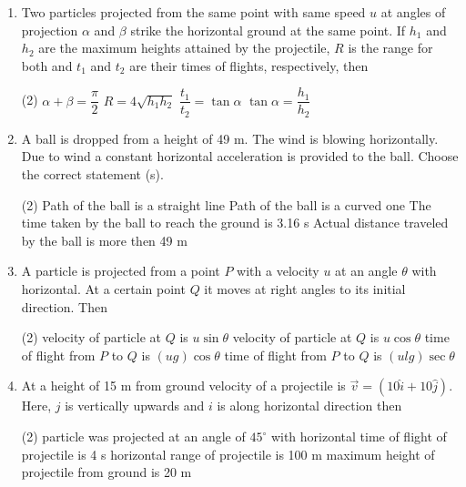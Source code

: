 \documentclass{article}
\renewcommand{\frac}[2]{\dfrac{#1}{#2}}
\begin{document}
\begin{enumerate}
    \item Two particles projected from the same point with same speed \( u \) at angles of projection \( \alpha \) and \( \beta \) strike the horizontal ground at the same point. If \( h_1 \) and \( h_2 \) are the maximum heights attained by the projectile, \( R \) is the range for both and \( t_1 \) and \( t_2 \) are their times of flights, respectively, then
    \begin{tasks}(2)
        \task \( \alpha + \beta = \frac{\pi}{2} \)
        \task \( R = 4 \sqrt{h_1 h_2} \)
        \task \( \frac{t_1}{t_2} = \tan \alpha \)
        \task \( \tan \alpha = \frac{h_1}{h_2} \)
    \end{tasks}
    
    \item A ball is dropped from a height of 49 m. The wind is blowing horizontally. Due to wind a constant horizontal acceleration is provided to the ball. Choose the correct statement (s).
    \begin{tasks}(2)
        \task Path of the ball is a straight line
        \task Path of the ball is a curved one
        \task The time taken by the ball to reach the ground is 3.16 s
        \task Actual distance traveled by the ball is more then 49 m
    \end{tasks}
    
    \item A particle is projected from a point \( P \) with a velocity \( u \) at an angle \( \theta \) with horizontal. At a certain point \( Q \) it moves at right angles to its initial direction. Then
    \begin{tasks}(2)
        \task velocity of particle at \( Q \) is \( u \sin \theta \)
        \task velocity of particle at \( Q \) is \( u \cos \theta \)
        \task time of flight from \( P \) to \( Q \) is \( (ug) \cos \theta \)
        \task time of flight from \( P \) to \( Q \) is \( (ulg) \sec \theta \)
    \end{tasks}
    
    \item At a height of 15 m from ground velocity of a projectile is \( \Vec{v} = (10\hat{i} + 10\hat{j}) \). Here, \( j \) is vertically upwards and \( i \) is along horizontal direction then
    \begin{tasks}(2)
        \task particle was projected at an angle of \( 45^{\circ} \) with horizontal
        \task time of flight of projectile is 4 s
        \task horizontal range of projectile is 100 m
        \task maximum height of projectile from ground is 20 m
    \end{tasks}
    

\end{enumerate}
\end{document}
